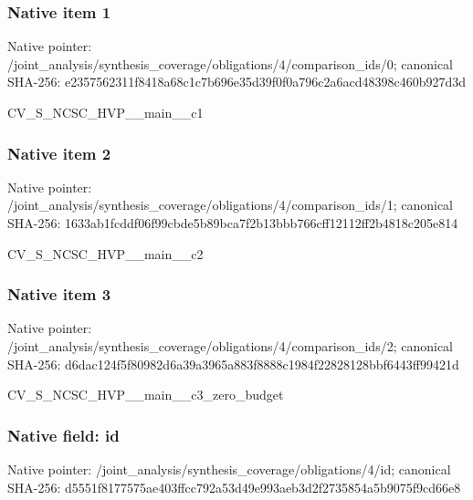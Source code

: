 \documentclass[10pt,a4paper]{article}
\begin{document}
\subsubsection{Native item 1}
Native pointer: /joint\_\allowbreak{}analysis/synthesis\_\allowbreak{}coverage/obligations/4/comparison\_\allowbreak{}ids/0; canonical SHA-256: e2357562311f8418a68c1c7b696e35d39f0f0a796c2a6acd48398c460b927d3d

\begingroup\raggedright\sloppy CV\_\allowbreak{}S\_\allowbreak{}NCSC\_\allowbreak{}HVP\_\allowbreak{}\_\allowbreak{}main\_\allowbreak{}\_\allowbreak{}c1\par\endgroup

\subsubsection{Native item 2}
Native pointer: /joint\_\allowbreak{}analysis/synthesis\_\allowbreak{}coverage/obligations/4/comparison\_\allowbreak{}ids/1; canonical SHA-256: 1633ab1fcddf06f99cbde5b89bca7f2b13bbb766cff12112ff2b4818c205e814

\begingroup\raggedright\sloppy CV\_\allowbreak{}S\_\allowbreak{}NCSC\_\allowbreak{}HVP\_\allowbreak{}\_\allowbreak{}main\_\allowbreak{}\_\allowbreak{}c2\par\endgroup

\subsubsection{Native item 3}
Native pointer: /joint\_\allowbreak{}analysis/synthesis\_\allowbreak{}coverage/obligations/4/comparison\_\allowbreak{}ids/2; canonical SHA-256: d6dac124f5f80982d6a39a3965a883f8888c1984f22828128bbf6443ff99421d

\begingroup\raggedright\sloppy CV\_\allowbreak{}S\_\allowbreak{}NCSC\_\allowbreak{}HVP\_\allowbreak{}\_\allowbreak{}main\_\allowbreak{}\_\allowbreak{}c3\_\allowbreak{}zero\_\allowbreak{}budget\par\endgroup

\subsubsection{Native field: id}
Native pointer: /joint\_\allowbreak{}analysis/synthesis\_\allowbreak{}coverage/obligations/4/id; canonical SHA-256: d5551f8177575ae403ffcc792a53d49e993aeb3d2f2735854a5b9075f9cd66e8
\end{document}

